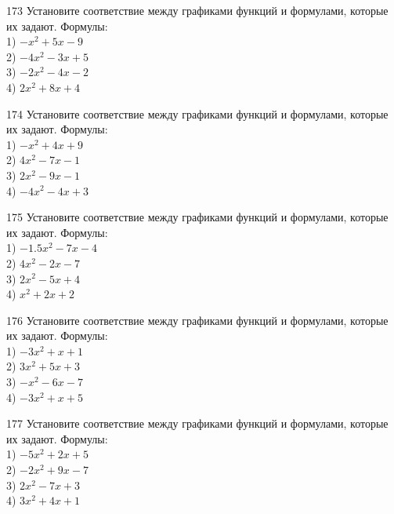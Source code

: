 \documentclass[4apaper]{article}
\begin{document}
\begin{taskBN}{173}
Установите соответствие между графиками функций и формулами, которые их задают. Формулы: \\1) $-x^2+5x-9$\\2) $-4x^2-3x+5$\\3) $-2x^2-4x-2$\\4) $2x^2+8x+4$
\end{taskBN}

\begin{taskBN}{174}
Установите соответствие между графиками функций и формулами, которые их задают. Формулы: \\1) $-x^2+4x+9$\\2) $4x^2-7x-1$\\3) $2x^2-9x-1$\\4) $-4x^2-4x+3$
\end{taskBN}

\begin{taskBN}{175}
Установите соответствие между графиками функций и формулами, которые их задают. Формулы: \\1) $-1.5x^2-7x-4$\\2) $4x^2-2x-7$\\3) $2x^2-5x+4$\\4) $x^2+2x+2$
\end{taskBN}

\begin{taskBN}{176}
Установите соответствие между графиками функций и формулами, которые их задают. Формулы: \\1) $-3x^2+x+1$\\2) $3x^2+5x+3$\\3) $-x^2-6x-7$\\4) $-3x^2+x+5$
\end{taskBN}

\begin{taskBN}{177}
Установите соответствие между графиками функций и формулами, которые их задают. Формулы: \\1) $-5x^2+2x+5$\\2) $-2x^2+9x-7$\\3) $2x^2-7x+3$\\4) $3x^2+4x+1$
\end{taskBN}
\end{document}
